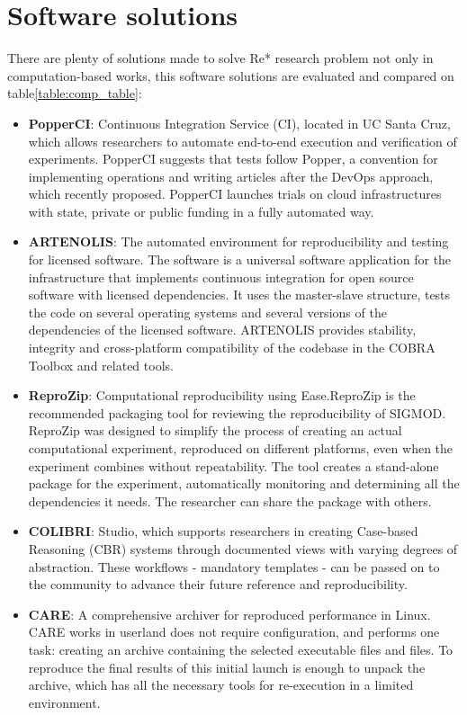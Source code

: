 \section{Software solutions}
There are plenty of solutions made to solve Re* research problem not only in computation-based works, this software solutions are evaluated and compared on table\ref{table:comp_table}:
\begin{itemize}
    \item \textbf{PopperCI}\cite{DBLP:conf/infocom/JimenezAALMMR17}: Continuous Integration Service (CI), located in UC Santa Cruz, which allows researchers to automate end-to-end execution and verification of experiments. PopperCI suggests that tests follow Popper, a convention for implementing operations and writing articles after the DevOps approach, which recently proposed. PopperCI launches trials on cloud infrastructures with state, private or public funding in a fully automated way. 
    \item \textbf{ARTENOLIS}\cite{DBLP:journals/corr/abs-1712-05236}: The automated environment for reproducibility and testing for licensed software. The software is a universal software application for the infrastructure that implements continuous integration for open source software with licensed dependencies. It uses the master-slave structure, tests the code on several operating systems and several versions of the dependencies of the licensed software. ARTENOLIS provides stability, integrity and cross-platform compatibility of the codebase in the COBRA Toolbox and related tools.
    \item \textbf{ReproZip}\cite{DBLP:conf/sigmod/ChirigatiRSF16}: Computational reproducibility using Ease.ReproZip is the recommended packaging tool for reviewing the reproducibility of SIGMOD. ReproZip was designed to simplify the process of creating an actual computational experiment, reproduced on different platforms, even when the experiment combines without repeatability. The tool creates a stand-alone package for the experiment, automatically monitoring and determining all the dependencies it needs. The researcher can share the package with others.
    \item \textbf{COLIBRI}\cite{DBLP:conf/iccbr/Recio-GarciaDG13}: Studio, which supports researchers in creating Case-based Reasoning (CBR) systems through documented views with varying degrees of abstraction. These workflows - mandatory templates - can be passed on to the community to advance their future reference and reproducibility.
    \item \textbf{CARE}\cite{DBLP:conf/pldi/JaninVD14}: A comprehensive archiver for reproduced performance in Linux. CARE works in userland does not require configuration, and performs one task: creating an archive containing the selected executable files and files. To reproduce the final results of this initial launch is enough to unpack the archive, which has all the necessary tools for re-execution in a limited environment.

\end{itemize}
